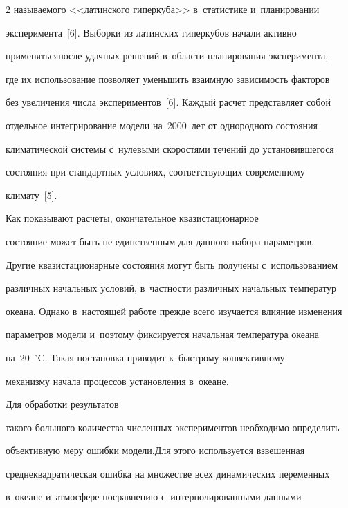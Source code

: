 \begin{multicols}{2}
называ\-емого <<латинского гиперкуба>> в~статистике и~планировании 


эксперимента~[6]. Выборки из латинских гиперкубов начали активно 


применяться\linebreak после удачных решений в~области планирования эксперимента, 


где их использование позволяет уменьшить взаимную зависимость факторов 


без увеличения числа экспериментов~[6]. Каждый расчет представляет собой 


отдельное интегрирование модели на~2000~лет от однородного состояния 


климатической системы с~нулевыми скоростями течений до установившегося 


состояния при стандартных условиях, соответствующих современному 


климату~[5]. 





Как показывают расчеты, окончательное квазистационарное 


состояние может быть не единственным для данного набора параметров. 


Другие квазистационарные состояния могут быть получены с~использованием 


различных начальных условий, в~частности различных начальных температур 


океана. Однако в~настоящей работе прежде всего изучается влияние изменения 


параметров модели и~поэтому фиксируется начальная температура океана 


на~20~$^\circ$C. Такая постановка приводит к~быстрому конвективному 


механизму начала процессов установления в~океане. 





Для обработки результатов 


такого большого количества численных экспериментов необходимо определить 


объективную меру ошибки модели.\linebreak Для этого используется взвешенная 


сред\-не\-квад\-ратическая ошибка на множестве всех динамических переменных 


в~океане и~атмосфере по\linebreak сравнению с~интерполированными данными 



\end{multicols}
